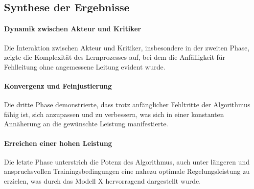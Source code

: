 \subsection{Synthese der Ergebnisse}
\label{sec:Synthesis_of_Results}


\paragraph{Dynamik zwischen Akteur und Kritiker}
Die Interaktion zwischen Akteur und Kritiker, insbesondere in der zweiten Phase, zeigte die Komplexität des Lernprozesses auf, bei dem die Anfälligkeit für Fehlleitung ohne angemessene Leitung evident wurde.

\paragraph{Konvergenz und Feinjustierung}
Die dritte Phase demonstrierte, dass trotz anfänglicher Fehltritte der Algorithmus fähig ist, sich anzupassen und zu verbessern, was sich in einer konstanten Annäherung an die gewünschte Leistung manifestierte.

\paragraph{Erreichen einer hohen Leistung}
Die letzte Phase unterstrich die Potenz des Algorithmus, auch unter längeren und anspruchsvollen Trainingsbedingungen eine nahezu optimale Regelungsleistung zu erzielen, was durch das Modell X hervorragend dargestellt wurde.

